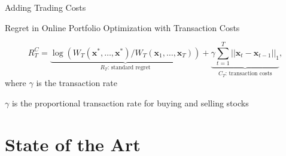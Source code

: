 \documentclass[10pt]{beamer}
\begin{document}
\begin{frame}{Adding Trading Costs}


\begin{exampleblock}{Regret in Online Portfolio Optimization with Transaction Costs}

$$R^C_T
=\underbrace{\log(W_T(\mathbf x^*,\ldots,\mathbf x^*)/W_T(\mathbf x_1,\ldots,\mathbf x_T))}_{R_T \text{: standard regret}}+\underbrace{\gamma\sum\limits_{t=1}^T||\mathbf x_t-\mathbf x_{t-1}||_1}_{C_T \text{: transaction costs}},$$
where $\gamma$ is the transaction rate
\end{exampleblock}




$\gamma$ is the proportional transaction rate for buying and selling stocks
\end{frame}

\section{State of the Art}


\end{document}
